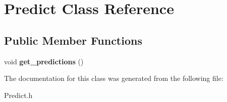 \hypertarget{classPredict}{}\section{Predict Class Reference}
\label{classPredict}
\subsection*{Public Member Functions}
\begin{DoxyCompactItemize}
\item 
\mbox{\label{classPredict_a175676c1acdaae512c6229e19a1d29d2}} 
void {\bfseries get\+\_\+predictions} ()
\end{DoxyCompactItemize}


The documentation for this class was generated from the following file\+:\begin{DoxyCompactItemize}
\item 
Predict.\+h\end{DoxyCompactItemize}
